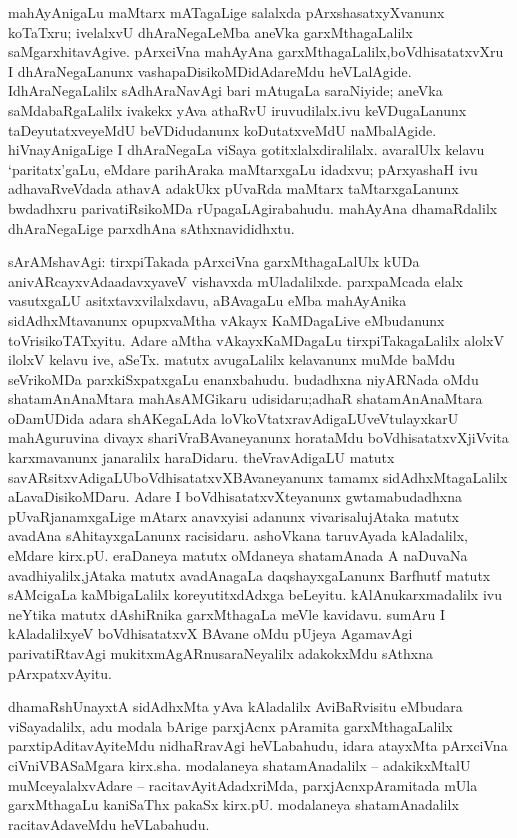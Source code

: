 mahAyAnigaLu maMtarx mATagaLige salalxda pArxshasatxyXvanunx koTaTxru; ivelalxvU dhAraNegaLeMba aneVka garxMthagaLalilx saMgarxhitavAgive. pArxciVna mahAyAna garxMthagaLalilx,\break boVdhisatatxvXru I dhAraNegaLanunx vashapaDisikoMDidAdareMdu heVLalAgide. I\break dhAraNegaLalilx sAdhAraNavAgi bari mAtugaLa saraNiyide; aneVka saMdabaRgaLalilx ivakekx yAva athaRvU iruvudilalx.ivu keVDugaLanunx taDeyutatxveyeMdU beVDidudanunx koDutatxveMdU naMbalAgide. hiVnayAnigaLige I dhAraNegaLa viSaya gotitxlalx\-diralilalx. avaralUlx kelavu `paritatx'gaLu, eMdare parihAraka maMtarxgaLu idadxvu; pArxyashaH ivu adhavaRveVdada athavA adakUkx pUvaRda maMtarx taMtarxgaLanunx bwdadhxru parivatiRsikoMDa rUpagaLAgirabahudu. mahAyAna dhamaRdalilx dhAraNegaLige parxdhAna sAthxnavididhxtu.

\newpage

sArAMshavAgi: tirxpiTakada pArxciVna garxMthagaLalUlx kUDa anivARcayxvAda\break adavxyaveV vishavxda mUladalilxde. parxpaMcada elalx vasutxgaLU asitxtavxvilalxdavu, aBAva\-gaLu eMba mahAyAnika sidAdhxMtavanunx opupxvaMtha vAkayx KaMDagaLive eMbudanunx toVrisikoTATxyitu. Adare aMtha vAkayxKaMDagaLu tirxpiTakagaLalilx alolxV ilolxV kelavu ive, aSeTx. matutx avugaLalilx kelavanunx muMde baMdu seVrikoMDa parxkiSxpatxgaLu enanx\-bahudu. budadhxna niyARNada oMdu shatamAnAnaMtara mahAsAMGikaru udi\-sidaru;\break adhaR shatamAnAnaMtara oDamUDida adara shAKegaLAda loVkoVtatxravAdigaLU\break veVtulayxkarU mahAguruvina divayx shariVraBAvaneyanunx horataMdu boVdhisatatxvX\break jiVvita karxmavanunx janaralilx haraDidaru. theVravAdigaLU matutx savARsitxvAdigaLU\break boVdhisatatxvXBAvaneyanunx tamamx sidAdhxMtagaLalilx aLavaDisikoMDaru. Adare I boVdhi\-satatxvXteyanunx gwtamabudadhxna pUvaRjanamxgaLige mAtarx anavxyisi adanunx vivarisalu\break jAtaka matutx avadAna sAhitayxgaLanunx racisidaru. ashoVkana taruvAyada kAladalilx, eMdare kirx.pU. eraDaneya matutx oMdaneya shatamAnada A naDuvaNa avadhiyalilx,\break jAtaka matutx avadAnagaLa daqshayxgaLanunx Barfhutf matutx sAMcigaLa kaMbigaLalilx kore\-yutitxdAdxga beLeyitu. kAlAnukarxmadalilx ivu neYtika matutx dAshiRnika garxMthagaLa meVle kavidavu. sumAru I kAladalilxyeV boVdhisatatxvX BAvane oMdu pUjeya Agama\-vAgi parivatiRtavAgi mukitxmAgARnusaraNeyalilx adakokxMdu sAthxna pArxpatxvAyitu.

dhamaRshUnayxtA sidAdhxMta yAva kAladalilx AviBaRvisitu eMbudara viSayadalilx, adu modala bArige parxjAcnx pAramita garxMthagaLalilx parxtipAditavAyiteMdu nidhaRravAgi heVLabahudu, idara atayxMta pArxciVna ciVniVBASaMgara kirx.sha. modalaneya shatamAnadalilx -- adakikxMtalU muMceyalalxvAdare -- racitavAyitAdadxriMda, parxjAcnxpAramitada mUla garxMthagaLu kaniSaThx pakaSx kirx.pU. modalaneya shatamAnadalilx racitavAdaveMdu heVLabahudu.

